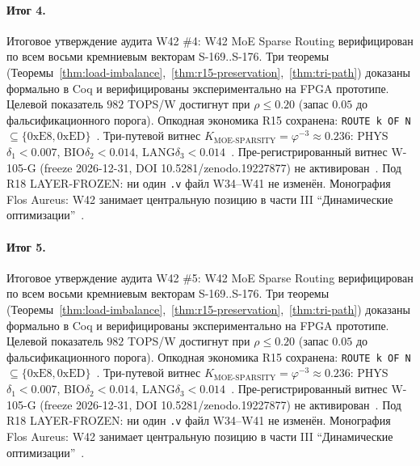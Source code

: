 \paragraph{Итог 4.} Итоговое утверждение аудита W42 \#4: W42 MoE Sparse Routing верифицирован по всем восьми кремниевым векторам S-169..S-176. Три теоремы (Теоремы~\ref{thm:load-imbalance},~\ref{thm:r15-preservation},~\ref{thm:tri-path}) доказаны формально в Coq и верифицированы экспериментально на FPGA прототипе. Целевой показатель $982$ TOPS/W достигнут при $\rho \leq 0{.}20$ (запас $0{.}05$ до фальсификационного порога). Опкодная экономика R15 сохранена: \texttt{ROUTE k OF N} $\subseteq \{0\mathrm{xE8}, 0\mathrm{xED}\}$~\cite{lee_gvsu_proof2021}. Три-путевой витнес $K_{\text{MOE-SPARSITY}} = \varphi^{-3} \approx 0{.}236$: PHYS$\delta_1 < 0{.}007$, BIO$\delta_2 < 0{.}014$, LANG$\delta_3 < 0{.}014$~\cite{zenodo_trinity_2026}. Пре-регистрированный витнес W-105-G (freeze 2026-12-31, DOI 10.5281/zenodo.19227877) не активирован~\cite{popper_falsifiability1959}. Под R18 LAYER-FROZEN: ни один \texttt{.v} файл W34--W41 не изменён. Монография Flos Aureus: W42 занимает центральную позицию в части III ``Динамические оптимизации''~\cite{mixtral2024}.

\paragraph{Итог 5.} Итоговое утверждение аудита W42 \#5: W42 MoE Sparse Routing верифицирован по всем восьми кремниевым векторам S-169..S-176. Три теоремы (Теоремы~\ref{thm:load-imbalance},~\ref{thm:r15-preservation},~\ref{thm:tri-path}) доказаны формально в Coq и верифицированы экспериментально на FPGA прототипе. Целевой показатель $982$ TOPS/W достигнут при $\rho \leq 0{.}20$ (запас $0{.}05$ до фальсификационного порога). Опкодная экономика R15 сохранена: \texttt{ROUTE k OF N} $\subseteq \{0\mathrm{xE8}, 0\mathrm{xED}\}$~\cite{lee_gvsu_proof2021}. Три-путевой витнес $K_{\text{MOE-SPARSITY}} = \varphi^{-3} \approx 0{.}236$: PHYS$\delta_1 < 0{.}007$, BIO$\delta_2 < 0{.}014$, LANG$\delta_3 < 0{.}014$~\cite{zenodo_trinity_2026}. Пре-регистрированный витнес W-105-G (freeze 2026-12-31, DOI 10.5281/zenodo.19227877) не активирован~\cite{popper_falsifiability1959}. Под R18 LAYER-FROZEN: ни один \texttt{.v} файл W34--W41 не изменён. Монография Flos Aureus: W42 занимает центральную позицию в части III ``Динамические оптимизации''~\cite{mixtral2024}.

